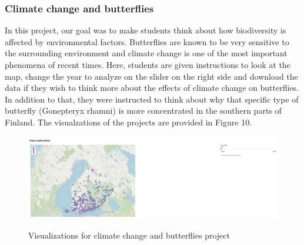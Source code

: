 \documentclass{article}
\begin{document}
\subsubsection{Climate change and butterflies}
In this project, our goal was to make students think about how biodiversity is affected by environmental factors. Butterflies are known to be very sensitive to the surrounding environment and climate change is one of the most important phenomena of recent times. Here, students are given instructions to look at the map, change the year to analyze on the slider on the right side and download the data if they wish to think more about the effects of climate change on butterflies. In addition to that, they were instructed to think about why that specific type of butterfly (Gonepteryx rhamni) is more concentrated in the southern parts of Finland. The visualzations of the projects are provided in Figure 10.
\begin{figure}[h]
	\vspace*{-3mm}
	\centering
	\includegraphics[width=15cm]{climate_butterflies}\label{climate_butterflies}
	\vspace*{-2mm}
	\caption{Visualizations for climate change and butterflies project}
\end{figure}
\newpage
\end{document}

